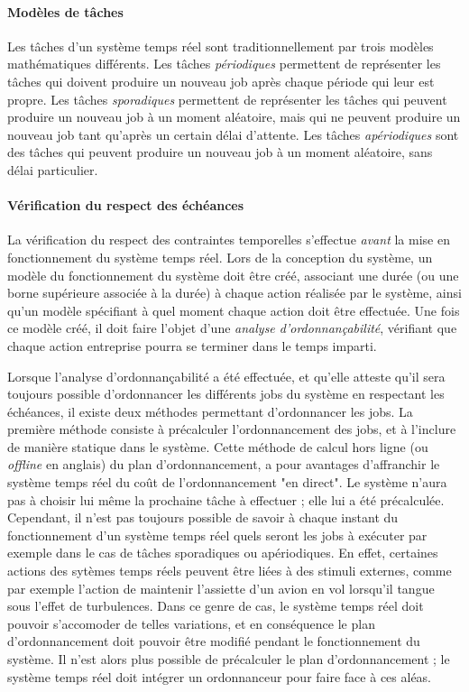 		\paragraph{Modèles de tâches}
		Les tâches d'un système temps réel sont traditionnellement par trois modèles mathématiques différents. Les tâches \emph{périodiques} permettent de représenter les tâches qui doivent produire un nouveau job après chaque période qui leur est propre. Les tâches \emph{sporadiques} permettent de représenter les tâches qui peuvent produire un nouveau job à un moment aléatoire, mais qui ne peuvent produire un nouveau job tant qu'après un certain délai d'attente. Les tâches \emph{apériodiques} sont des tâches qui peuvent produire un nouveau job à un moment aléatoire, sans délai particulier.

		\paragraph{Vérification du respect des échéances}
		La vérification du respect des contraintes temporelles s'effectue \emph{avant} la mise en fonctionnement du système temps réel. Lors de la conception du système, un modèle du fonctionnement du système doit être créé, associant une durée (ou une borne supérieure associée à la durée) à chaque action réalisée par le système, ainsi qu'un modèle spécifiant à quel moment chaque action doit être effectuée. Une fois ce modèle créé, il doit faire l'objet d'une \emph{analyse d'ordonnançabilité}, vérifiant que chaque action entreprise pourra se terminer dans le temps imparti.

		Lorsque l'analyse d'ordonnançabilité a été effectuée, et qu'elle atteste qu'il sera toujours possible d'ordonnancer les différents jobs du système en respectant les échéances, il existe deux méthodes permettant d'ordonnancer les jobs. La première méthode consiste à précalculer l'ordonnancement des jobs, et à l'inclure de manière statique dans le système. Cette méthode de calcul hors ligne (ou \emph{offline} en anglais) du plan d'ordonnancement, a pour avantages d'affranchir le système temps réel du coût de l'ordonnancement "en direct". Le système n'aura pas à choisir lui même la prochaine tâche à effectuer ; elle lui a été précalculée. Cependant, il n'est pas toujours possible de savoir à chaque instant du fonctionnement d'un système temps réel quels seront les jobs à exécuter par exemple dans le cas de tâches sporadiques ou apériodiques. En effet, certaines actions des sytèmes temps réels peuvent être liées à des stimuli externes, comme par exemple l'action de maintenir l'assiette d'un avion en vol lorsqu'il tangue sous l'effet de turbulences. Dans ce genre de cas, le système temps réel doit pouvoir s'accomoder de telles variations, et en conséquence le plan d'ordonnancement doit pouvoir être modifié pendant le fonctionnement du système. Il n'est alors plus possible de précalculer le plan d'ordonnancement ; le système temps réel doit intégrer un ordonnanceur pour faire face à ces aléas.

